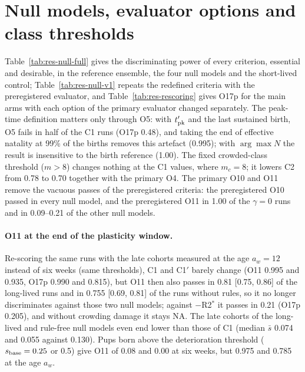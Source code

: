 \documentclass[pre,onecolumn,superscriptaddress,notitlepage]{revtex4-2}
\begin{document}
\section{Null models, evaluator options and class thresholds}
\label{supp:null}

Table~\ref{tab:res-null-full} gives the discriminating power of every criterion, essential and desirable, in the
reference ensemble, the four null models and the short-lived control; Table~\ref{tab:res-null-v1} repeats the redefined
criteria with the preregistered evaluator, and Table~\ref{tab:res-rescoring} gives O17p for the main arms with each
option of the primary evaluator changed separately. The peak-time definition matters only through O5: with
$t'_{\rm pk}$ and the last sustained birth, O5 fails in half of the \textsf{C1} runs (O17p 0.48), and taking the
end of effective natality at 99\% of the births removes this artefact (0.995); with $\arg\max N$ the result is
insensitive to the birth reference (1.00). The fixed crowded-class threshold ($m>8$) changes nothing at the
\textsf{C1} values, where $m_c=8$; it lowers \textsf{C2} from 0.78 to 0.70 together with the primary O4. The
primary O10 and O11 remove the vacuous passes of the preregistered criteria: the preregistered O10 passed in every
null model, and the preregistered O11 in 1.00 of the $\gamma=0$ runs and in 0.09--0.21 of the other null models.

\paragraph{O11 at the end of the plasticity window.}
Re-scoring the same runs with the late cohorts measured at the age $a_w=12$ instead of six weeks (same thresholds),
\textsf{C1} and \textsf{C1}$'$ barely change (O11 0.995 and 0.935, O17p 0.990 and 0.815), but O11 then also passes in
0.81 [0.75, 0.86] of the long-lived runs and in 0.755 [0.69, 0.81] of the runs without rules, so it no longer
discriminates against those two null models; against $-$R2$^*$ it passes in 0.21 (O17p 0.205), and without
crowding damage it stays NA. The late cohorts of the long-lived and rule-free null models even end lower than
those of \textsf{C1} (median $\bar s$ 0.074 and 0.055 against 0.130). Pups born above the deterioration threshold
($s_{\rm base}=0.25$ or 0.5) give O11 of 0.08 and 0.00 at six weeks, but 0.975 and 0.785 at the age $a_w$.
\end{document}
